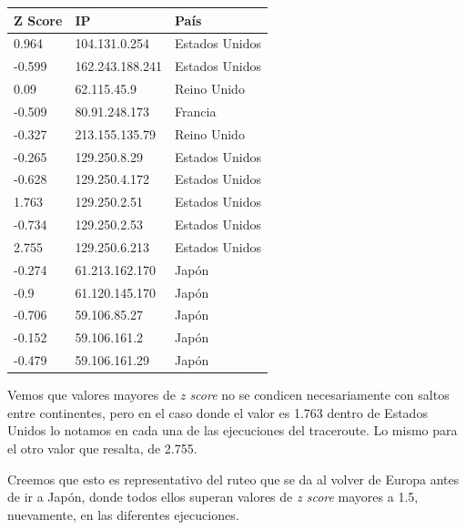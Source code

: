 \begin{table}[h]
	\begin{tabular}{l|l|l}
		Z Score & IP & País \\ \hline
		0.964 & 104.131.0.254 & Estados Unidos \\
		-0.599 & 162.243.188.241 & Estados Unidos \\
		0.09 & 62.115.45.9 & Reino Unido \\
		-0.509 & 80.91.248.173 & Francia \\
		-0.327 & 213.155.135.79 & Reino Unido \\
		-0.265 & 129.250.8.29 & Estados Unidos \\
		-0.628 & 129.250.4.172 & Estados Unidos \\
		1.763 & 129.250.2.51 & Estados Unidos \\
		-0.734 & 129.250.2.53 & Estados Unidos \\
		2.755 & 129.250.6.213 & Estados Unidos \\
		-0.274 & 61.213.162.170 & Japón \\
		-0.9 & 61.120.145.170 & Japón \\
		-0.706 & 59.106.85.27 & Japón \\
		-0.152 & 59.106.161.2 & Japón \\
		-0.479 & 59.106.161.29 & Japón
	\end{tabular}
\end{table}

Vemos que valores mayores de \textit{z score} no se condicen necesariamente con saltos entre continentes, pero en el caso donde el valor es 1.763 dentro de Estados Unidos lo notamos en cada una de las ejecuciones del traceroute. Lo mismo para el otro valor que resalta, de 2.755.

Creemos que esto es representativo del ruteo que se da al volver de Europa antes de ir a Japón, donde todos ellos superan valores de \textit{z score} mayores a 1.5, nuevamente, en las diferentes ejecuciones.